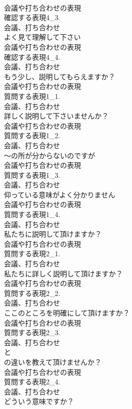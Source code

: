 \documentclass[8pt]{extreport}
\begin{document}
\begin{CJK}{UTF8}{min}
\\	会議や打ち合わせの表現
\\	確認する表現4_3.
\\	会議、打ち合わせ
\\	よく見て理解して下さい	
\\	会議や打ち合わせの表現
\\	確認する表現4_4.
\\	会議、打ち合わせ
\\	もう少し、説明してもらえますか？	
\\	会議や打ち合わせの表現
\\	質問する表現1_1.
\\	会議、打ち合わせ
\\	詳しく説明して下さいませんか？	
\\	会議や打ち合わせの表現
\\	質問する表現1_2.
\\	会議、打ち合わせ
\\	～の所が分からないのですが	
\\	会議や打ち合わせの表現
\\	質問する表現1_3.
\\	会議、打ち合わせ
\\	仰っている意味がよく分かりません	
\\	会議や打ち合わせの表現
\\	質問する表現1_4.
\\	会議、打ち合わせ
\\	私たちに説明して頂けますか？	
\\	会議や打ち合わせの表現
\\	質問する表現2_1.
\\	会議、打ち合わせ
\\	私たちに詳しく説明して頂けますか？	
\\	会議や打ち合わせの表現
\\	質問する表現2_2.
\\	会議、打ち合わせ
\\	ここのところを明確にして頂けますか？	
\\	会議や打ち合わせの表現
\\	質問する表現2_3.
\\	会議、打ち合わせ
\\	と
\\	の違いを教えて頂けませんか？	
\\	会議や打ち合わせの表現
\\	質問する表現2_4.
\\	会議、打ち合わせ
\\	どういう意味ですか？	

\end{CJK}
\end{document}
